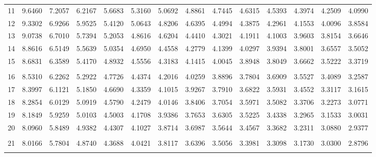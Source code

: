 {\begin{tabular}{l|lllllllllllll}
\\ 
 11 & 9.6460 & 7.2057 & 6.2167 & 5.6683 & 5.3160 & 5.0692 & 4.8861 & 4.7445 & 4.6315 & 4.5393 & 4.3974 & 4.2509 & 4.0990 \\[5pt] \arrayrulecolor{light-gray}\hline\arrayrulecolor{black}  
 12 & 9.3302 & 6.9266 & 5.9525 & 5.4120 & 5.0643 & 4.8206 & 4.6395 & 4.4994 & 4.3875 & 4.2961 & 4.1553 & 4.0096 & 3.8584 \\[5pt] \arrayrulecolor{light-gray}\hline\arrayrulecolor{black}  
 13 & 9.0738 & 6.7010 & 5.7394 & 5.2053 & 4.8616 & 4.6204 & 4.4410 & 4.3021 & 4.1911 & 4.1003 & 3.9603 & 3.8154 & 3.6646 \\[5pt] \arrayrulecolor{light-gray}\hline\arrayrulecolor{black}  
 14 & 8.8616 & 6.5149 & 5.5639 & 5.0354 & 4.6950 & 4.4558 & 4.2779 & 4.1399 & 4.0297 & 3.9394 & 3.8001 & 3.6557 & 3.5052 \\[5pt] \arrayrulecolor{light-gray}\hline\arrayrulecolor{black}  
 15 & 8.6831 & 6.3589 & 5.4170 & 4.8932 & 4.5556 & 4.3183 & 4.1415 & 4.0045 & 3.8948 & 3.8049 & 3.6662 & 3.5222 & 3.3719 \\[5pt] \arrayrulecolor{light-gray}\hline\arrayrulecolor{black}  
\\ 
 16 & 8.5310 & 6.2262 & 5.2922 & 4.7726 & 4.4374 & 4.2016 & 4.0259 & 3.8896 & 3.7804 & 3.6909 & 3.5527 & 3.4089 & 3.2587 \\[5pt] \arrayrulecolor{light-gray}\hline\arrayrulecolor{black}  
 17 & 8.3997 & 6.1121 & 5.1850 & 4.6690 & 4.3359 & 4.1015 & 3.9267 & 3.7910 & 3.6822 & 3.5931 & 3.4552 & 3.3117 & 3.1615 \\[5pt] \arrayrulecolor{light-gray}\hline\arrayrulecolor{black}  
 18 & 8.2854 & 6.0129 & 5.0919 & 4.5790 & 4.2479 & 4.0146 & 3.8406 & 3.7054 & 3.5971 & 3.5082 & 3.3706 & 3.2273 & 3.0771 \\[5pt] \arrayrulecolor{light-gray}\hline\arrayrulecolor{black}  
 19 & 8.1849 & 5.9259 & 5.0103 & 4.5003 & 4.1708 & 3.9386 & 3.7653 & 3.6305 & 3.5225 & 3.4338 & 3.2965 & 3.1533 & 3.0031 \\[5pt] \arrayrulecolor{light-gray}\hline\arrayrulecolor{black}  
 20 & 8.0960 & 5.8489 & 4.9382 & 4.4307 & 4.1027 & 3.8714 & 3.6987 & 3.5644 & 3.4567 & 3.3682 & 3.2311 & 3.0880 & 2.9377 \\[5pt] \arrayrulecolor{light-gray}\hline\arrayrulecolor{black}  
\\ 
 21 & 8.0166 & 5.7804 & 4.8740 & 4.3688 & 4.0421 & 3.8117 & 3.6396 & 3.5056 & 3.3981 & 3.3098 & 3.1730 & 3.0300 & 2.8796 \\[5pt] \arrayrulecolor{light-gray}\hline\arrayrulecolor{black}  

\end{tabular}}
